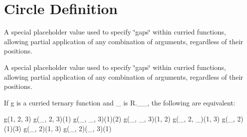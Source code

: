 \hypertarget{group__groupCircleDefinition}{}\section{Circle Definition}
\label{group__groupCircleDefinition}


A special placeholder value used to specify \char`\"{}gaps\char`\"{} within curried functions, allowing partial application of any combination of arguments, regardless of their positions.  


A special placeholder value used to specify \char`\"{}gaps\char`\"{} within curried functions, allowing partial application of any combination of arguments, regardless of their positions. 

If g is a curried ternary function and \+\_\+ is R.\+\_\+\+\_\+, the following are equivalent\+:

g(1, 2, 3) g(\+\_\+, 2, 3)(1) g(\+\_\+, \+\_\+, 3)(1)(2) g(\+\_\+, \+\_\+, 3)(1, 2) g(\+\_\+, 2, \+\_\+)(1, 3) g(\+\_\+, 2)(1)(3) g(\+\_\+, 2)(1, 3) g(\+\_\+, 2)(\+\_\+, 3)(1) 